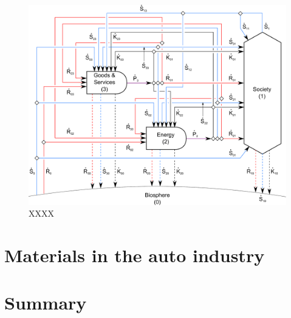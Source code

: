 \begin{figure}[h!]
\centering
\includegraphics[width=0.8\linewidth]{Part_1/Chapter_Materials/images/3_sector_materials.pdf}
\caption{XXXX}
\label{fig:C_materials}
\end{figure}

\section{Materials in the auto industry}
\label{sec:materials_auto}

\section{Summary}
\label{sec:materials_summary}







%
%

